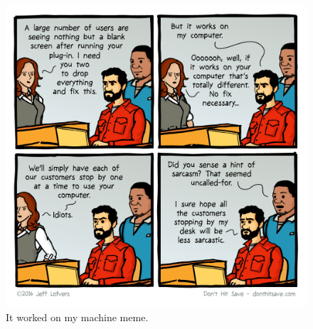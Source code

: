 \begin{figure}[htbp]
    \centering
    \includegraphics[width=0.5\linewidth]{figures/it-worked-on-my-machine.png}
    \caption{It worked on my machine meme.}
    \label{fig:It_Worked_On_My_Machine}
\end{figure}
